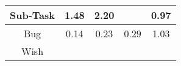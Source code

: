 \begin{tabular}{|c||c|c|c|c|}
\hline
Sub-Task & \cellcolor[rgb]{0.8928905252391367,0.8318955119553805,0.42} 1.48 & \cellcolor[rgb]{0.8676038659123532,0.819917620695325,0.42} 2.20 &  & \cellcolor[rgb]{0.9042111815997304,0.8125995929053903,0.414597102826415} 0.97 \\ 
\hline
Bug & \cellcolor[rgb]{0.7658517010007121,0.15769805140337034,0.2854615876006646} 0.14 & \cellcolor[rgb]{0.780962917714837,0.2292244771835617,0.2995653898671812} 0.23 & \cellcolor[rgb]{0.7909765488357846,0.27662233115604695,0.3089114455800656} 0.29 & \cellcolor[rgb]{0.9090469823363696,0.8395485705803856,0.42} 1.03 \\ 
\hline
Wish &  &  &  &  \\ 
\hline
\end{tabular}